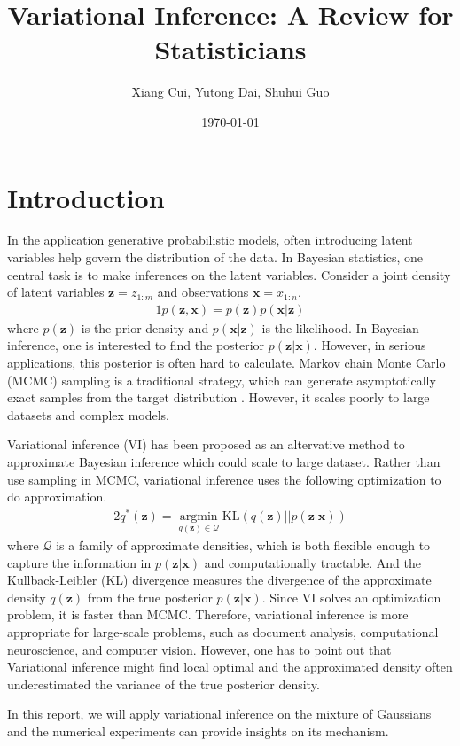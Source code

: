 \documentclass[letterpaper]{article}
\title{Variational Inference: A Review for Statisticians}
\author{Xiang Cui, Yutong Dai, Shuhui Guo}
\date{\today}
\newcommand{\bz}{\mathbf{z}}
\newcommand{\bx}{\mathbf{x}}
\begin{document}
\maketitle
\section{Introduction}
In the application generative probabilistic models, often introducing latent variables help govern the distribution of the data. In Bayesian statistics, one central task is to make inferences on the latent variables. Consider a joint density of latent variables $\bz=z_{1:m}$ and observations $\bx=x_{1:n}$,
\begin{alignat}{1}\label{eq:1}
p(\bz,\bx) = p(\bz)p(\bx | \bz)
\end{alignat}
where $p(\bz)$ is the prior density and $p(\bx|\bz)$ is the likelihood. In Bayesian inference, one is interested to find the posterior $p(\bz|\bx)$. However, in serious applications, this posterior is often hard to calculate. Markov chain Monte Carlo (MCMC) sampling is a traditional strategy, which can generate asymptotically exact samples from the target distribution \citep{robert2013monte}. However, it scales poorly to large datasets and complex models.

Variational inference (VI) has been proposed as an altervative method to approximate Bayesian inference which could scale to large dataset. Rather than use sampling in MCMC, variational inference uses the following optimization to do approximation. \begin{alignat}{2}\label{eq:2}
q^{\ast} (\bz) = \underset{q(\bz)\in \mathscr{Q}}{\operatorname{argmin}} \mathrm{KL} (q(\bz) || p(\bz|\bx))
\end{alignat}
where $\mathscr{Q}$ is a family of approximate densities, which is both flexible enough to capture the information in $p(\bz|\bx)$ and computationally tractable. And the Kullback-Leibler (KL) divergence measures the divergence of the approximate density $q(\bz)$ from the true posterior $p(\bz|\bx)$. Since VI solves an optimization problem, it is faster than MCMC. Therefore, variational inference is more appropriate for large-scale problems, such as document analysis, computational neuroscience, and computer vision. However, one has to point out that Variational inference might find local optimal and the approximated density often underestimated the variance of the true posterior density.

In this report, we will apply variational inference on the mixture of Gaussians and the numerical experiments can provide insights on its mechanism.
\end{document}
